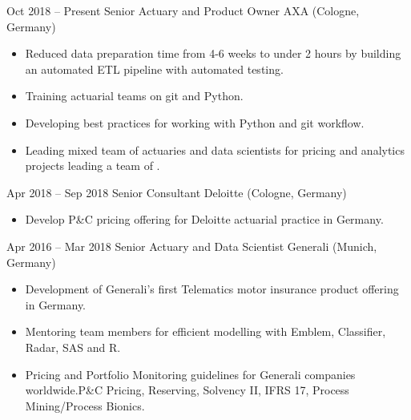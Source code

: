 \documentclass[
	a4paper,
]{fortysecondscv}
\begin{document}
\makefrontsidebar


	\begin{cvtable}[3]
		\cvitem
			{Oct 2018 -- Present}
			{Senior Actuary and Product Owner}
			{AXA (Cologne, Germany)}
			{				
				\vspace{-\topsep}
				\begin{itemize}[nosep, leftmargin=0pt] %
  					\item Reduced data preparation time from 4-6 weeks to under 2 hours by building an automated ETL pipeline with automated testing.
  					\item Training actuarial teams on git and Python.
  					\item Developing best practices for working with Python and git workflow.
  					\item Leading mixed team of actuaries and data scientists for pricing and analytics projects leading a team of .
				\end{itemize}
			}
		\cvitem
			{Apr 2018 -- Sep 2018}
			{Senior Consultant}
			{Deloitte (Cologne, Germany)}
			{				
				\vspace{-\topsep}
				\begin{itemize}[nosep, leftmargin=0pt] %
  					\item Develop P\&C pricing offering for Deloitte actuarial practice in Germany.
				\end{itemize}
			}
		\cvitem
			{Apr 2016 -- Mar 2018}
			{Senior Actuary and Data Scientist}
			{Generali (Munich, Germany)}
			{				
				\vspace{-\topsep}
				\begin{itemize}[nosep, leftmargin=0pt] %
					  \item Development of Generali’s first Telematics motor insurance product offering in Germany.
					  \item Mentoring team members for efficient modelling with Emblem, Classifier, Radar, SAS and R.
					  \item Pricing and Portfolio Monitoring guidelines for Generali companies worldwide.P\&C Pricing, Reserving, Solvency II, IFRS 17, Process Mining/Process Bionics.

\end{itemize}}
\end{cvtable}
\end{document}
